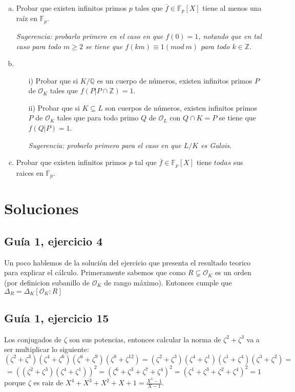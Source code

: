 \documentclass[12pt]{amsart}
\newcommand{\QQ}{\mathbb{Q}}
\newcommand{\ZZ}{\mathbb{Z}}
\newcommand{\FF}{\mathbb{F}}
\newcommand{\OO}{\mathcal{O}}
\newcommand{\lp}{\left(}
\newcommand{\rp}{\right)}
\theoremstyle{plain}
\begin{document}
\begin{enumerate}[a)]
    \item Probar que existen infinitos primos $p$ tales que $\bar{f}\in
    \FF_p[X]$ tiene al menos una raíz en $\FF_p$.

    \textit{Sugerencia: probarlo primero en el caso en que $f(0) = 1$, 
    notando que en tal caso para todo $m \geq 2$ se tiene que 
    $f(km)\equiv 1 (mod\ m)$ para todo $k\in \ZZ$}.
    
    \item \begin{enumerate}
        \item[\textup{i)}] Probar que si $K/\QQ$ es un cuerpo de números, existen 
        infinitos primos $P$ de $\OO_K$ tales que $f(P|P\cap\ZZ)=1$.

        \item[\textup{ii)}] Probar que si $K\subseteq L$ son cuerpos de números, 
        existen infinitos primos $P$ de $\OO_K$ tales que para todo 
        primo $Q$ de $\OO_L$ con $Q\cap K = P$ se tiene que $f(Q|P)=1$.

        \textit{Sugerencia: probarlo primero para el caso en que $L/K$
        es Galois}.
    \end{enumerate}
    
    \item Probar que existen infinitos primos $p$ tal que $\bar{f}\in
    \FF_p[X]$ tiene $todas$ sus raices en $\FF_p$.
\end{enumerate}





\newpage

\section*{Soluciones}

\subsection*{Guía 1, ejercicio 4}
Un poco hablemos de la solución del ejercicio que presenta el resultado
teorico para explicar el cálculo. Primeramente sabemos que como 
$R \subsetneq \OO_K$ es un orden (por definicion subanillo de $\OO_K$
de rango máximo). Entonces cumple que $\Delta_R = \Delta_K [\OO_K:R]$


\subsection*{Guía 1, ejercicio 15}
Los conjugados de $\zeta$ son sus potencias, entonces calcular la norma
de $\zeta^2+\zeta^3$ va a ser multiplicar lo siguiente:
$$(\zeta^2+\zeta^3)(\zeta^4+\zeta^6)(\zeta^6+\zeta^9)(\zeta^8+\zeta^{12})
= (\zeta^2+\zeta^3)(\zeta^4+\zeta^1)(\zeta^1+\zeta^4)(\zeta^3+\zeta^2)=$$
$$=\lp(\zeta^2+\zeta^3)(\zeta^4+\zeta^1)\rp^2=
(\zeta^6+\zeta^3+\zeta^7+\zeta^4)^2=(\zeta^1+\zeta^3+\zeta^2+\zeta^4)^2=
1$$
porque $\zeta$ es raiz de $X^4+X^3+X^2+X+1 = \frac{X^5-1}{X-1}$.
\end{document}
